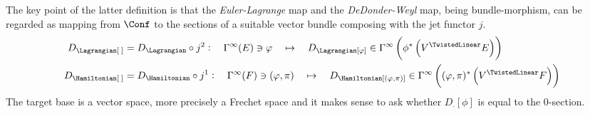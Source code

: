 \documentclass[a4paper,12pt,fleqn]{scrartcl}  %
\begin{document}
The key point of the latter definition is that the \emph{Euler-Lagrange} map and the \emph{DeDonder-Weyl} map, being bundle-morphism, can be regarded as mapping from $\Conf$ to the sections of a suitable vector bundle composing with the jet functor $j$.
%
\begin{align*}
	D_\Lagrangian[\; ] &= 
	D_\Lagrangian \circ j^2 : \quad \Gamma^\infty(E) \ni \varphi \quad \mapsto \quad D_\Lagrangian[ \varphi ] \in \Gamma^\infty \left( \phi^\ast \left(V^\TwistedLinear E \right)\right) \\
	D_\Hamiltonian[\; ] &= 
	D_\Hamiltonian \circ j^1 : \quad \Gamma^\infty(F) \ni (\varphi,\pi) \quad \mapsto \quad D_\Hamiltonian[ (\varphi,\pi) ] \in \Gamma^\infty \left( (\varphi,\pi)^\ast \left(V^\TwistedLinear F \right)\right)
\end{align*}
%
The target base is a vector space, more precisely a Frechet space \cite[Cap.2]{Ban} and it makes sense to ask whether $D_\cdot [\phi]$ is equal to the 0-section.
\end{document}
